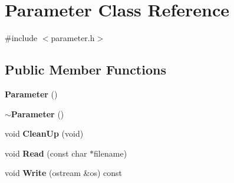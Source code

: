 \section{Parameter Class Reference}
\label{classParameter}


{\ttfamily \#include $<$parameter.\-h$>$}

\subsection*{Public Member Functions}
\begin{DoxyCompactItemize}
\item 
{\bf Parameter} ()
\item 
{\bf $\sim$\-Parameter} ()
\item 
void {\bf Clean\-Up} (void)
\item 
void {\bf Read} (const char $\ast$filename)
\item 
void {\bf Write} (ostream \&os) const 
\end{DoxyCompactItemize}
